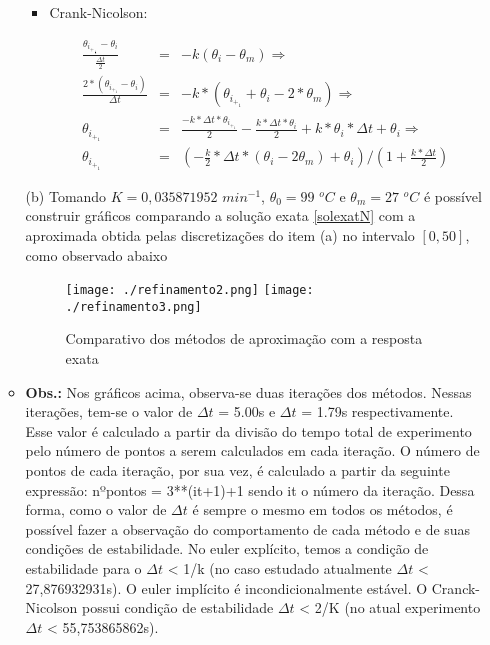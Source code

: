 \documentclass{article}
\begin{document}
\begin{itemize}
\begin{itemize}
\begin{itemize}
\item Crank-Nicolson:

\begin{eqnarray}
    \frac{\theta_i_+_\frac{1}{2} - \theta_i}{\frac{\Delta t}{2}} &=& -k(\theta_i - \theta_m)
    \Rightarrow \\
    \frac{2*(\theta_i_+_1 - \theta_i)}{\Delta t} &=& -k * (\theta_i_+_1 + \theta_i  - 2*\theta_m) 
    \Rightarrow \\
    \theta_i_+_1 &=& \frac{-k * \Delta t * \theta_i_+_1}{2} - \frac{k * \Delta t * \theta_i}{2} + k * \theta_i * \Delta t + \theta_i
    \Rightarrow\\
    \theta_i_+_1 &=& (-\frac{k}{2}*\Delta t * (\theta_i - 2\theta_m) + \theta_i) / (1 + \frac{k*\Delta t}{2})
\end{eqnarray}
\end{itemize}

 \newpage
 
 \item[(b)] Tomando $K=0,035871952$ $min^{-1}$, $\theta_0=99$ $^oC$ e $\theta_m=27$ $^oC$ é possível construir gráficos comparando a solução exata \eqref{solexatN} com a aproximada obtida pelas discretizações do item (a) no intervalo $[0,50]$, como observado abaixo
\begin{figure}[h]
\caption{Comparativo dos métodos de aproximação com a resposta exata}
\centering
  \texttt{[image: ./refinamento2.png]} 
  \texttt{[image: ./refinamento3.png]}
\end{figure}

\item
\textbf{Obs.:} Nos gráficos acima, observa-se duas iterações dos métodos. Nessas iterações, tem-se o valor de $\Delta t$ = 5.00s e $\Delta t$ = 1.79s respectivamente. Esse valor é calculado a partir da divisão do tempo total de experimento pelo número de pontos a serem calculados em cada iteração. O número de pontos de cada iteração, por sua vez, é calculado a partir da seguinte expressão: nºpontos = 3**(it+1)+1 sendo it o número da iteração. Dessa forma, como o valor de $\Delta t$ é sempre o mesmo em todos os métodos, é possível fazer a observação do comportamento de cada método e de suas condições de estabilidade. No euler explícito, temos a condição de estabilidade para o $\Delta t$ < 1/k (no caso estudado atualmente $\Delta t$ < 27,876932931s). O euler implícito é incondicionalmente estável. O Cranck-Nicolson possui condição de estabilidade $\Delta t$ < 2/K (no atual experimento $\Delta t$ < 55,753865862s).



\end{itemize}
\end{itemize}
\end{document}
